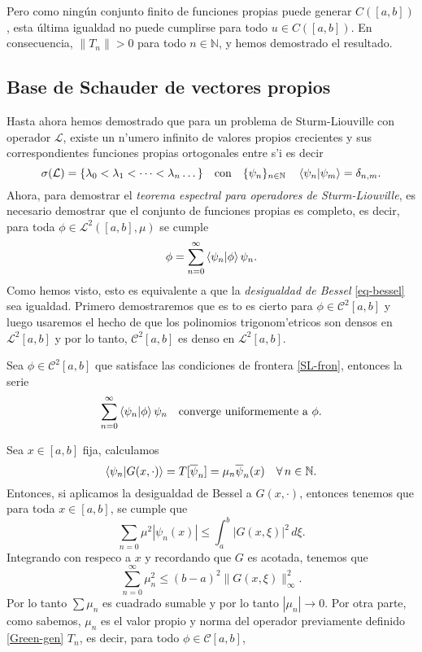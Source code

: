 \documentclass[main.tex]{subfiles}
\begin{document}
Pero como ningún conjunto finito de funciones propias puede generar $C([a,b])$, esta última igualdad no puede cumplirse para todo $u \in C([a,b])$. En consecuencia, $\|T_n\| > 0$ para todo $n \in \mathbb{N}$, y hemos demostrado el resultado. \QED

\subsection{Base de Schauder de vectores propios}

\noindent Hasta ahora hemos demostrado que para un problema de Sturm-Liouville con operador $\mathcal{L}$, existe un n'umero infinito de valores propios crecientes y sus correspondientes funciones propias ortogonales entre s'i es decir
\[
  \sigma(\mathcal{L})=\{\lambda_{0}<\lambda_{1}<\dots<\lambda_{n}\dots\}\quad\text{con}\quad
  \{\psi_{n}\}_{n\in \mathbb N }\quad\braket{\psi_{n}|\psi_{m}}=\delta_{n,m}.
\]
Ahora, para demostrar el \emph{teorema espectral para operadores de Sturm-Liouville}, es necesario demostrar que el conjunto de funciones propias es completo, es decir, para toda $\phi\in\mathcal{L}^{2}([a,b],\mu)$ se cumple
\[
  \phi=\sum_{n=0}^{\infty}\braket{\psi_{n}|\phi}\psi_{n}.
\]
Como hemos visto, esto es equivalente a que la \emph{desigualdad de Bessel} \ref{eq-bessel} sea igualdad. Primero demostraremos que es to es cierto para $\phi\in\mathcal{C}^{2}[a,b]$ y luego usaremos el hecho de que los polinomios trigonom'etricos son densos en $\mathcal{L}^{2}[a,b]$ y por lo tanto, $\mathcal{C}^{2}[a,b]$ es denso en $\mathcal{L}^{2}[a,b]$.
\begin{teorema}
  Sea $\phi\in\mathcal{C}^{2}[a,b]$ que satisface las condiciones de frontera \ref{SL-fron}, entonces la serie
  \[
    \sum_{n=0}^{\infty}\braket{\psi_{n}|\phi}\psi_{n}\quad\text{converge uniformemente a }\phi.
  \]
\end{teorema}
\dem Sea $x\in[a,b]$ fija, calculamos
\[
  \braket{\psi_{n}|G(x,\cdot)}=T[\overline{\psi}_{n}]=\mu_{n}\overline{\psi}_{n}(x)\quad\forall\,n\in \mathbb N .
\]
Entonces, si aplicamos la desigualdad de Bessel a $G(x,\cdot)$, entonces tenemos que para toda $x\in[a,b]$, se cumple que
\[
  \sum_{n=0}\mu^{2}|\psi_{n}(x)|\leq\int_{a}^{b}|G(x,\xi)|^{2}\,d\xi.
\]
Integrando con respeco a $x$ y recordando que $G$ es acotada, tenemos que
\[
  \sum_{n=0}^{\infty}\mu_{n}^{2}\leq(b-a)^{2}\|G(x,\xi)\|^{2}_{\infty}.
\]
Por lo tanto $\sum\mu_{n}$ es cuadrado sumable y por lo tanto $|\mu_{n}|\to0$. Por otra parte, como sabemos, $\mu_{n}$ es el valor propio y  norma del operador previamente definido \ref{Green-gen} $T_{n}$, es decir, para todo $\phi\in\mathcal{C}[a,b]$,
\end{document}
